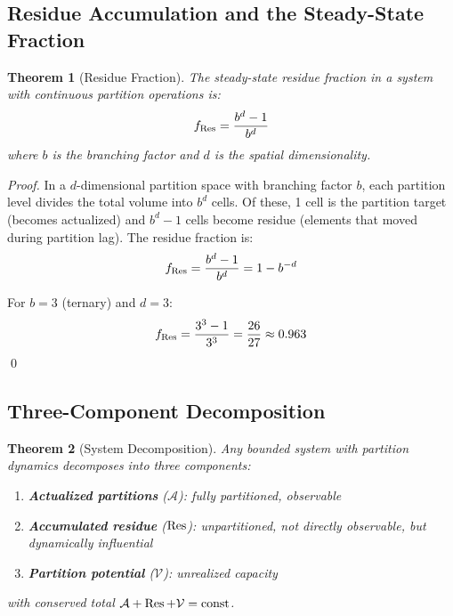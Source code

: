 \documentclass[twocolumn,10pt,a4paper]{article}
\newtheorem{theorem}{Theorem}[section]
\theoremstyle{definition}
\theoremstyle{remark}
\newcommand{\Potential}{\mathcal{V}}
\begin{document}
\subsection{Residue Accumulation and the Steady-State Fraction}

\begin{theorem}[Residue Fraction]
\label{thm:fraction}
The steady-state residue fraction in a system with continuous partition operations is:
\begin{equation}
    f_{\Residue} = \frac{b^d - 1}{b^d}
\end{equation}
where $b$ is the branching factor and $d$ is the spatial dimensionality.
\end{theorem}

\begin{proof}
In a $d$-dimensional partition space with branching factor $b$, each partition level divides the total volume into $b^d$ cells. Of these, 1 cell is the partition target (becomes actualized) and $b^d - 1$ cells become residue (elements that moved during partition lag). The residue fraction is:
\begin{equation}
    f_{\Residue} = \frac{b^d - 1}{b^d} = 1 - b^{-d}
\end{equation}

For $b = 3$ (ternary) and $d = 3$:
\begin{equation}
    f_{\Residue} = \frac{3^3 - 1}{3^3} = \frac{26}{27} \approx 0.963
\end{equation}
\qed
\end{proof}

\subsection{Three-Component Decomposition}

\begin{theorem}[System Decomposition]
\label{thm:decomposition}
Any bounded system with partition dynamics decomposes into three components:
\begin{enumerate}
    \item \textbf{Actualized partitions} ($\mathcal{A}$): fully partitioned, observable
    \item \textbf{Accumulated residue} ($\Residue$): unpartitioned, not directly observable, but dynamically influential
    \item \textbf{Partition potential} ($\Potential$): unrealized capacity
\end{enumerate}
with conserved total $\mathcal{A} + \Residue + \Potential = \text{const}$.
\end{theorem}
\end{document}

